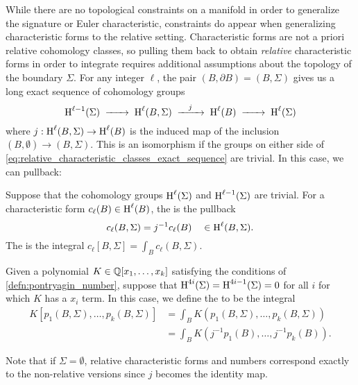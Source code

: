 While there are no topological constraints on a manifold in order to generalize the signature or Euler characteristic, constraints do appear when generalizing characteristic forms to the relative setting.
Characteristic forms are not a priori relative cohomology classes, so pulling them back to obtain \emph{relative} characteristic forms in order to integrate requires additional assumptions about the topology of the boundary $\Sigma$.
For any integer $\ell$, the pair $(B, \partial B) = (B, \Sigma)$ gives us a long exact sequence of cohomology groups
\begin{equation}\label{eq:relative_characteristic_classes_exact_sequence}
	\H^{\ell-1}(\Sigma) \lkxto \H^{\ell}(B, \Sigma) \lkxto[j] \H^{\ell}(B) \lkxto \H^{\ell}(\Sigma)
\end{equation}
where $j : \operatorname{H}^{\ell}(B, \Sigma) \to \operatorname{H}^{\ell}(B)$ is the induced map of the inclusion $(B,\emptyset) \to (B, \Sigma)$. This is an isomorphism if the groups on either side of \cref{eq:relative_characteristic_classes_exact_sequence} are trivial. In this case, we can pullback:

\begin{definition}\label{defn:relative_characteristic_form}
	Suppose that the cohomology groups $\operatorname{H}^{\ell}(\Sigma)$ and $\operatorname{H}^{\ell-1}(\Sigma)$ are trivial. For a characteristic form $c_\ell(B) \in \operatorname{H}^{\ell}(B)$, the  is the pullback
	\[
		c_\ell(B, \Sigma) = j^{-1} c_\ell(B) \quad\in \operatorname{H}^{\ell}(B, \Sigma).
	\]
	The  is the integral $c_\ell[B,\Sigma]=\int_B c_\ell(B,\Sigma)$.
\end{definition}

\begin{definition}\label{defn:relative_characteristic_number}
	Given a polynomial $K\in \mathbb{Q}[x_1,\ldots, x_k]$ satisfying the conditions of \cref{defn:pontryagin_number}, suppose that $\operatorname{H}^{4i}(\Sigma) = \operatorname{H}^{4i-1}(\Sigma)=0$ for all $i$ for which $K$ has a $x_i$ term.
	In this case, we define the  to be the integral
	\[
		\begin{aligned}
			K[p_1(B, \Sigma), \ldots, p_k(B,\Sigma)]
			 & = \int_B K(p_1(B, \Sigma), \ldots, p_k(B, \Sigma)) \\
			 & = \int_B K(j^{-1}p_1(B), \ldots, j^{-1}p_k(B)).
		\end{aligned}
	\]
\end{definition}

\begin{remark}
	Note that if $\Sigma=\emptyset$, relative characteristic forms and numbers correspond exactly to the non-relative versions since $j$ becomes the identity map.
\end{remark}

